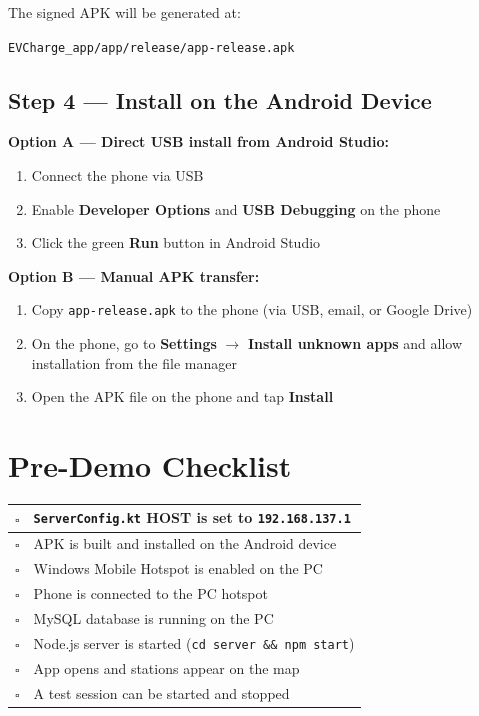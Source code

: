 \documentclass[12pt,a4paper]{article}
\begin{document}
The signed APK will be generated at:

\begin{codebox}
\texttt{EVCharge\_app/app/release/app-release.apk}
\end{codebox}

\subsection{Step 4 --- Install on the Android Device}

\textbf{Option A --- Direct USB install from Android Studio:}
\begin{enumerate}[leftmargin=1.5cm]
  \item Connect the phone via USB
  \item Enable \textbf{Developer Options} and \textbf{USB Debugging} on the phone
  \item Click the green \textbf{Run} button in Android Studio
\end{enumerate}

\textbf{Option B --- Manual APK transfer:}
\begin{enumerate}[leftmargin=1.5cm]
  \item Copy \texttt{app-release.apk} to the phone (via USB, email, or Google Drive)
  \item On the phone, go to \textbf{Settings} $\rightarrow$ \textbf{Install unknown apps}
        and allow installation from the file manager
  \item Open the APK file on the phone and tap \textbf{Install}
\end{enumerate}

\section{Pre-Demo Checklist}

\begin{center}
\renewcommand{\arraystretch}{1.5}
\begin{tabular}{|p{0.5cm}|p{12cm}|}
  \hline
   $\square$ & \texttt{ServerConfig.kt} HOST is set to \texttt{192.168.137.1} \\ \hline
  $\square$ & APK is built and installed on the Android device \\ \hline
  $\square$ & Windows Mobile Hotspot is enabled on the PC \\ \hline
  $\square$ & Phone is connected to the PC hotspot \\ \hline
  $\square$ & MySQL database is running on the PC \\ \hline
  $\square$ & Node.js server is started (\texttt{cd server \&\& npm start}) \\ \hline
  $\square$ & App opens and stations appear on the map \\ \hline
  $\square$ & A test session can be started and stopped \\ \hline
\end{tabular}
\end{center}
\end{document}
